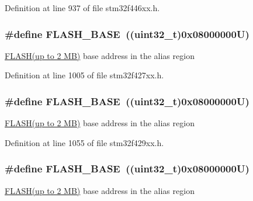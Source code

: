 Definition at line 937 of file stm32f446xx.\+h.

\subsubsection[{\texorpdfstring{F\+L\+A\+S\+H\+\_\+\+B\+A\+SE}{FLASH_BASE}}]{\setlength{\rightskip}{0pt plus 5cm}\#define F\+L\+A\+S\+H\+\_\+\+B\+A\+SE~((uint32\+\_\+t)0x08000000\+U)}\hypertarget{group___peripheral__memory__map_ga23a9099a5f8fc9c6e253c0eecb2be8db}{}\label{group___peripheral__memory__map_ga23a9099a5f8fc9c6e253c0eecb2be8db}
\hyperlink{group___peripheral__declaration_ga844ea28ba1e0a5a0e497f16b61ea306b}{F\+L\+A\+S\+H(up to 2 M\+B)} base address in the alias region 

Definition at line 1005 of file stm32f427xx.\+h.

\subsubsection[{\texorpdfstring{F\+L\+A\+S\+H\+\_\+\+B\+A\+SE}{FLASH_BASE}}]{\setlength{\rightskip}{0pt plus 5cm}\#define F\+L\+A\+S\+H\+\_\+\+B\+A\+SE~((uint32\+\_\+t)0x08000000\+U)}\hypertarget{group___peripheral__memory__map_ga23a9099a5f8fc9c6e253c0eecb2be8db}{}\label{group___peripheral__memory__map_ga23a9099a5f8fc9c6e253c0eecb2be8db}
\hyperlink{group___peripheral__declaration_ga844ea28ba1e0a5a0e497f16b61ea306b}{F\+L\+A\+S\+H(up to 2 M\+B)} base address in the alias region 

Definition at line 1055 of file stm32f429xx.\+h.

\subsubsection[{\texorpdfstring{F\+L\+A\+S\+H\+\_\+\+B\+A\+SE}{FLASH_BASE}}]{\setlength{\rightskip}{0pt plus 5cm}\#define F\+L\+A\+S\+H\+\_\+\+B\+A\+SE~((uint32\+\_\+t)0x08000000\+U)}\hypertarget{group___peripheral__memory__map_ga23a9099a5f8fc9c6e253c0eecb2be8db}{}\label{group___peripheral__memory__map_ga23a9099a5f8fc9c6e253c0eecb2be8db}
\hyperlink{group___peripheral__declaration_ga844ea28ba1e0a5a0e497f16b61ea306b}{F\+L\+A\+S\+H(up to 2 M\+B)} base address in the alias region 

